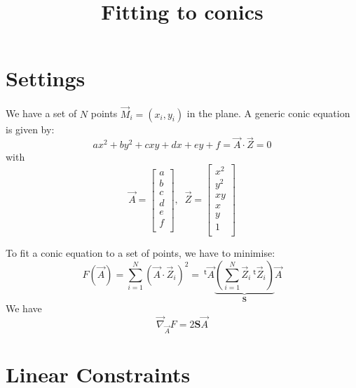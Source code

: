 \documentclass[aps]{revtex4}
\newcommand{\mymat}[1]{\boldsymbol{#1}}
\newcommand{\mytrn}[1]{~^{\mathsf{t}}\!{#1}}
\newcommand{\mygrad}{\vec{\nabla}}
\begin{document}
\title{Fitting to conics}
\maketitle
\section{Settings}

We have a set of $N$ points $\vec{M}_i = (x_i,y_i)$ in the plane.
A generic conic equation is given by:
\begin{equation}
	a x^2 + b y^2 + c xy + d x + e y + f = \vec{A}\cdot\vec{Z} = 0
\end{equation}
with
\begin{equation}
	\vec{A} = \begin{bmatrix}
		a\\
		b\\
		c\\
		d\\
		e\\
		f\\
	\end{bmatrix}, \;\;
	\vec{Z} = \begin{bmatrix}
	x^2\\
	y^2\\
	xy\\
	x\\
	y\\
	1\\
	\end{bmatrix}
\end{equation}

To fit a conic equation to a set of points, we have to minimise:
\begin{equation}
	F(\vec{A}) = \sum_{i=1}^N \left( \vec{A}\cdot\vec{Z}_i\right)^2 =
	 \mytrn{\vec{A}} \underbrace{\left(\sum_{i=1}^N \vec{Z}_i\mytrn{\vec{Z}}_i\right)}_{\mymat{S}} \vec{A}
\end{equation}
We have
\begin{equation}
	\mygrad_{\vec{A}} F = 2 \mymat{S}\vec{A}
\end{equation}

\section{Linear Constraints}
\end{document}
